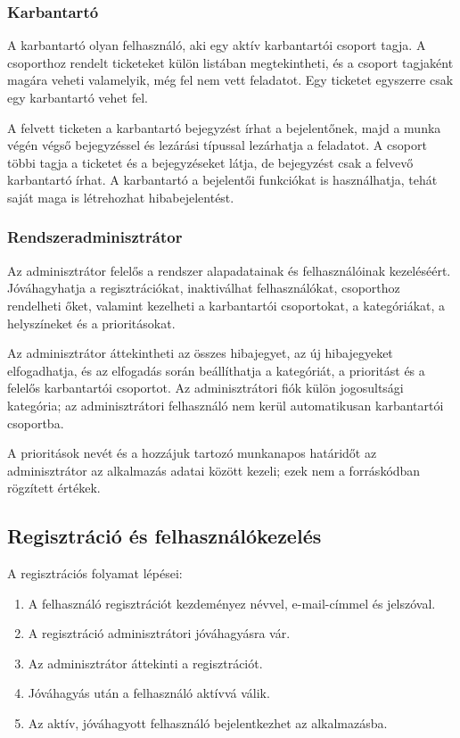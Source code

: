 \documentclass[12pt, a4paper, twoside]{article}
\begin{document}
\subsubsection{Karbantartó}

A karbantartó olyan felhasználó, aki egy aktív karbantartói csoport tagja. A csoporthoz rendelt ticketeket külön listában megtekintheti, és a csoport tagjaként magára veheti valamelyik, még fel nem vett feladatot. Egy ticketet egyszerre csak egy karbantartó vehet fel.

A felvett ticketen a karbantartó bejegyzést írhat a bejelentőnek, majd a munka végén végső bejegyzéssel és lezárási típussal lezárhatja a feladatot. A csoport többi tagja a ticketet és a bejegyzéseket látja, de bejegyzést csak a felvevő karbantartó írhat. A karbantartó a bejelentői funkciókat is használhatja, tehát saját maga is létrehozhat hibabejelentést.

\subsubsection{Rendszeradminisztrátor}

Az adminisztrátor felelős a rendszer alapadatainak és felhasználóinak kezeléséért. Jóváhagyhatja a regisztrációkat, inaktiválhat felhasználókat, csoporthoz rendelheti őket, valamint kezelheti a karbantartói csoportokat, a kategóriákat, a helyszíneket és a prioritásokat.

Az adminisztrátor áttekintheti az összes hibajegyet, az új hibajegyeket elfogadhatja, és az elfogadás során beállíthatja a kategóriát, a prioritást és a felelős karbantartói csoportot. Az adminisztrátori fiók külön jogosultsági kategória; az adminisztrátori felhasználó nem kerül automatikusan karbantartói csoportba.

A prioritások nevét és a hozzájuk tartozó munkanapos határidőt az adminisztrátor az alkalmazás adatai között kezeli; ezek nem a forráskódban rögzített értékek.

\subsection{Regisztráció és felhasználókezelés}

A regisztrációs folyamat lépései:

\begin{enumerate}
    \item A felhasználó regisztrációt kezdeményez névvel, e-mail-címmel és jelszóval.
    \item A regisztráció adminisztrátori jóváhagyásra vár.
    \item Az adminisztrátor áttekinti a regisztrációt.
    \item Jóváhagyás után a felhasználó aktívvá válik.
    \item Az aktív, jóváhagyott felhasználó bejelentkezhet az alkalmazásba.
\end{enumerate}
\end{document}

